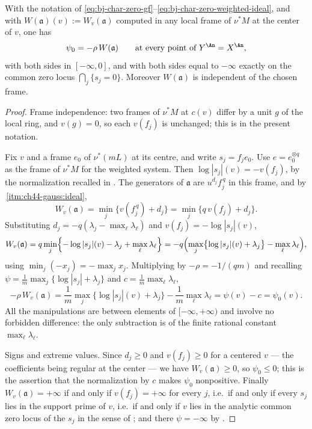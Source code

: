 \begin{lemma}
\label{lem:ch44-weight-encoding}
With the notation of
\eqref{eq:bj-char-zero-gf}--\eqref{eq:bj-char-zero-weighted-ideal}, and with
$W(\mathfrak a)(v):=W_v(\mathfrak a)$ computed in any local frame of
$\nu^*M$ at the center of $v$, one has
\[
 \psi_0=-\rho\,W(\mathfrak a)
 \qquad\text{at every point of }Y^{\An}=X^{\An},
\]
with both sides in $[-\infty,0]$, and with both sides equal to
$-\infty$ exactly on the common zero locus $\bigcap_j\{s_j=0\}$.
Moreover $W(\mathfrak a)$ is independent of the chosen frame.
\end{lemma}

\begin{proof}
Frame independence: two frames of $\nu^*M$ at $c(v)$ differ by a unit
$g$ of the local ring, and $v(g)=0$, so each $v(f_{j})$ is unchanged;
this is  in the present notation.

Fix $v$ and a frame $e_0$ of $\nu^*(mL)$ at its centre, and
write $s_j=f_j e_0$.  Use $e=e_0^{\otimes q}$ as the frame of
$\nu^*M$ for the weighted system.  Then
$\log|s_j|(v)=-v(f_j)$, by the normalization recalled in
.  The generators of $\mathfrak a$ are
$u^{d_j}f_j^{\,q}$ in this frame, and by
\,\cref{itm:ch44-gauss:ideal},
\[
 W_v(\mathfrak a)
 =\min_j\bigl\{v(f_j^{\,q})+d_j\bigr\}
 =\min_j\bigl\{q\,v(f_j)+d_j\bigr\}.
\]
Substituting $d_j=-q(\lambda_j-\max_\ell\lambda_\ell)$ and
$v(f_j)=-\log|s_j|(v)$,
\[
 W_v(\mathfrak a)
 =q\min_j\Bigl\{-\log|s_j|(v)-\lambda_j+\max_\ell\lambda_\ell\Bigr\}
 =-q\Bigl(\max_j\bigl\{\log|s_j|(v)+\lambda_j\bigr\}-\max_\ell\lambda_\ell\Bigr),
\]
using $\min_j(-x_j)=-\max_jx_j$.  Multiplying by
$-\rho=-1/(qm)$ and recalling $\psi=\frac1m\max_j\{\log|s_j|+\lambda_j\}$
and $c=\frac1m\max_\ell\lambda_\ell$,
\[
 -\rho\,W_v(\mathfrak a)
 =\frac1m\max_j\{\log|s_j|(v)+\lambda_j\}-\frac1m\max_\ell\lambda_\ell
 =\psi(v)-c=\psi_0(v).
\]
All the manipulations are between elements of $[-\infty,+\infty)$ and
involve no forbidden difference: the only subtraction is of the finite
rational constant $\max_\ell\lambda_\ell$.

Signs and extreme values.  Since $d_j\ge0$ and $v(f_j)\ge0$ for a
centered $v$ --- the coefficients being regular at the center --- we have
$W_v(\mathfrak a)\ge0$, so $\psi_0\le0$; this is the assertion that the
normalization by $c$ makes $\psi_0$ nonpositive.  Finally
$W_v(\mathfrak a)=+\infty$ if and only if $v(f_j)=+\infty$ for every
$j$, i.e.\ if and only if every $s_j$ lies in the support prime of
$v$, i.e.\ if and only if $v$ lies in the analytic common zero locus of
the $s_j$ in the sense of ; and
there $\psi=-\infty$ by .
\end{proof}

